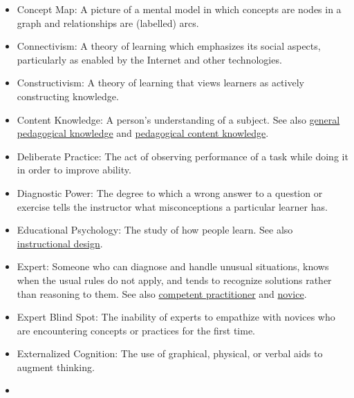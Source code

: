 \documentclass[10pt,statementpaper]{memoir}
\begin{document}
\begin{itemize}
{  Practitioner}: Someone who can do normal tasks with normal effort
  under normal circumstances. See also \href{gloss.html\#novice}{novice}
  and \href{gloss.html\#novice}{expert}.
\item
  \protect\hypertarget{concept-map}{}{Concept Map}: A picture of a
  mental model in which concepts are nodes in a graph and relationships
  are (labelled) arcs.
\item
  \protect\hypertarget{connectivism}{}{Connectivism}: A theory of
  learning which emphasizes its social aspects, particularly as enabled
  by the Internet and other technologies.
\item
  \protect\hypertarget{constructivism}{}{Constructivism}: A theory of
  learning that views learners as actively constructing knowledge.
\item
  \protect\hypertarget{content-knowledge}{}{Content Knowledge}: A
  person's understanding of a subject. See also
  \href{gloss.html\#general-pedagogical-knowledge}{general pedagogical
  knowledge} and
  \href{gloss.html\#pedagogical-content-knowledge}{pedagogical content
  knowledge}.
\item
  \protect\hypertarget{deliberate-practice}{}{Deliberate Practice}: The
  act of observing performance of a task while doing it in order to
  improve ability.
\item
  \protect\hypertarget{diagnostic-power}{}{Diagnostic Power}: The degree
  to which a wrong answer to a question or exercise tells the instructor
  what misconceptions a particular learner has.
\item
  \protect\hypertarget{educational-psychology}{}{Educational
  Psychology}: The study of how people learn. See also
  \href{gloss.html\#instructional-design}{instructional design}.
\item
  \protect\hypertarget{expert}{}{Expert}: Someone who can diagnose and
  handle unusual situations, knows when the usual rules do not apply,
  and tends to recognize solutions rather than reasoning to them. See
  also \href{gloss.html\#competent-practitioner}{competent practitioner}
  and \href{gloss.html\#novice}{novice}.
\item
  \protect\hypertarget{expert-blind-spot}{}{Expert Blind Spot}: The
  inability of experts to empathize with novices who are encountering
  concepts or practices for the first time.
\item
  \protect\hypertarget{externalized-cognition}{}{Externalized
  Cognition}: The use of graphical, physical, or verbal aids to augment
  thinking.
\item

\end{itemize}
\end{document}
